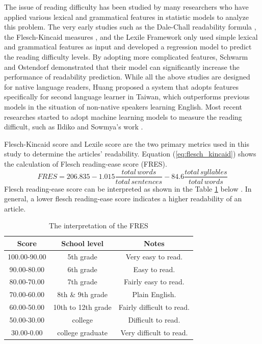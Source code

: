 The issue of reading difficulty has been studied by many researchers who have applied various lexical and grammatical features in statistic models to analyze this problem. The very early studies such as the Dale-Chall readability formula \cite{DaleChall1995,DaleChall1948}, the Flesch-Kincaid measures \cite{Kincaid1975}, and the Lexile Framework \cite{Lexile1996} only used simple lexical and grammatical features as input and developed a regression model to predict the reading difficulty levels. By adopting more complicated features, Schwarm and Ostendorf \cite{Ostendorf2005} demonstrated that their model can significantly increase the performance of readability prediction. While all the above studies are designed for native language readers, Huang \cite{Huang2011} proposed a system that adopts features specifically for second language learner in Taiwan, which outperforms previous models in the situation of non-native speakers learning English. Most recent researches started to adopt machine learning models to measure the reading difficult, such as Ildiko and Sowmya's work \cite{ElenaSowmya}.

Flesch-Kincaid score and Lexile score are the two primary metrics used in this study to determine the articles' readability. Equation (\ref{eq:flesch_kincaid}) shows the calculation of Flesch reading-ease score (FRES).
\begin{equation}\label{eq:flesch_kincaid}
  FRES = 206.835 - 1.015\frac{total \, words}{total \, sentences} - 84.6\frac{total \, syllables}{total \, words}
\end{equation}
Flesch reading-ease score can be interpreted as shown in the Table \ref{table:flesch_kincaid} below \cite{flesch1979write}. In general, a lower flesch reading-ease score indicates a higher readability of an article.
\begin{table}[btp]
 \caption{\label{table:flesch_kincaid} The interpretation of the FRES}
 \begin{center}
  \begin{tabular}{ccc}
   \hline
   Score & School level & Notes \\
   \hline
   100.00-90.00 & 5th grade & Very easy to read. \\
   90.00-80.00 & 6th grade & Easy to read. \\
   80.00-70.00 & 7th grade & Fairly easy to read. \\
   70.00-60.00 & 8th \& 9th grade & Plain English. \\
   60.00-50.00 & 10th to 12th grade & Fairly difficult to read. \\
   50.00-30.00 & college & 	Difficult to read. \\
   30.00-0.00 & college graduate & Very difficult to read. \\
   \hline
  \end{tabular} 
 \end{center}
\end{table}

